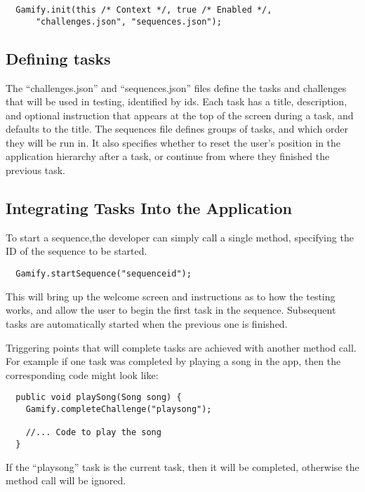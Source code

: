 \begin{verbatim}
  Gamify.init(this /* Context */, true /* Enabled */,
      "challenges.json", "sequences.json");
\end{verbatim}

\subsection{Defining tasks}

The ``challenges.json'' and ``sequences.json'' files define the tasks and
challenges that will be used in testing, identified by ids. Each task has a title, description, and optional instruction that appears at the top of the screen during a task, and defaults to the title. The sequences file defines groups of tasks, and which order they will be run in. It also specifies whether to reset the user's position in the application hierarchy after a task, or continue from where they finished the previous task.

\subsection{Integrating Tasks Into the Application}

To start a sequence,the developer can simply call a single method, specifying the ID of the sequence
to be started.

\begin{verbatim}
  Gamify.startSequence("sequenceid");
\end{verbatim}

This will bring up the welcome screen and instructions as to how the testing works,
and allow the user to begin the first task in the sequence. Subsequent tasks are
automatically started when the previous one is finished.

Triggering points that will complete tasks are achieved with another method
call. For example if one task was completed by playing a song in the app, then
the corresponding code might look like:

\begin{verbatim}
  public void playSong(Song song) {
    Gamify.completeChallenge("playsong");

    //... Code to play the song
  }
\end{verbatim}

If the ``playsong'' task is the current task, then it will be completed,
otherwise the method call will be ignored.

